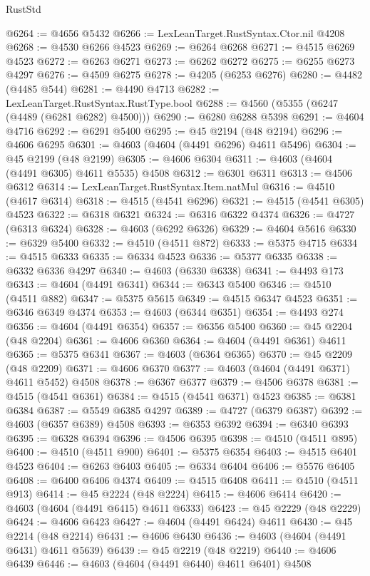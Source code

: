 \begin{lexlean}{RustStd}
\begin{coremodule}
@6264 := @4656 @5432
@6266 := LexLeanTarget.RustSyntax.Ctor.nil @4208
@6268 := @4530 @6266 @4523
@6269 := @6264 @6268
@6271 := @4515 @6269 @4523
@6272 := @6263 @6271
@6273 := @6262 @6272
@6275 := @6255 @6273 @4297
@6276 := @4509 @6275
@6278 := @4205 (@6253 @6276)
@6280 := @4482 (@4485 @544)
@6281 := @4490 @4713
@6282 := LexLeanTarget.RustSyntax.RustType.bool
@6288 := @4560 (@5355 (@6247 (@4489 (@6281 @6282) @4500)))
@6290 := @6280 @6288 @5398
@6291 := @4604 @4716
@6292 := @6291 @5400
@6295 := @45 @2194 (@48 @2194)
@6296 := @4606 @6295
@6301 := @4603 (@4604 (@4491 @6296) @4611 @5496)
@6304 := @45 @2199 (@48 @2199)
@6305 := @4606 @6304
@6311 := @4603 (@4604 (@4491 @6305) @4611 @5535) @4508
@6312 := @6301 @6311
@6313 := @4506 @6312
@6314 := LexLeanTarget.RustSyntax.Item.natMul
@6316 := @4510 (@4617 @6314)
@6318 := @4515 (@4541 @6296)
@6321 := @4515 (@4541 @6305) @4523
@6322 := @6318 @6321
@6324 := @6316 @6322 @4374
@6326 := @4727 (@6313 @6324)
@6328 := @4603 (@6292 @6326)
@6329 := @4604 @5616
@6330 := @6329 @5400
@6332 := @4510 (@4511 @872)
@6333 := @5375 @4715
@6334 := @4515 @6333
@6335 := @6334 @4523
@6336 := @5377 @6335
@6338 := @6332 @6336 @4297
@6340 := @4603 (@6330 @6338)
@6341 := @4493 @173
@6343 := @4604 (@4491 @6341)
@6344 := @6343 @5400
@6346 := @4510 (@4511 @882)
@6347 := @5375 @5615
@6349 := @4515 @6347 @4523
@6351 := @6346 @6349 @4374
@6353 := @4603 (@6344 @6351)
@6354 := @4493 @274
@6356 := @4604 (@4491 @6354)
@6357 := @6356 @5400
@6360 := @45 @2204 (@48 @2204)
@6361 := @4606 @6360
@6364 := @4604 (@4491 @6361) @4611
@6365 := @5375 @6341
@6367 := @4603 (@6364 @6365)
@6370 := @45 @2209 (@48 @2209)
@6371 := @4606 @6370
@6377 := @4603 (@4604 (@4491 @6371) @4611 @5452) @4508
@6378 := @6367 @6377
@6379 := @4506 @6378
@6381 := @4515 (@4541 @6361)
@6384 := @4515 (@4541 @6371) @4523
@6385 := @6381 @6384
@6387 := @5549 @6385 @4297
@6389 := @4727 (@6379 @6387)
@6392 := @4603 (@6357 @6389) @4508
@6393 := @6353 @6392
@6394 := @6340 @6393
@6395 := @6328 @6394
@6396 := @4506 @6395
@6398 := @4510 (@4511 @895)
@6400 := @4510 (@4511 @900)
@6401 := @5375 @6354
@6403 := @4515 @6401 @4523
@6404 := @6263 @6403
@6405 := @6334 @6404
@6406 := @5576 @6405
@6408 := @6400 @6406 @4374
@6409 := @4515 @6408
@6411 := @4510 (@4511 @913)
@6414 := @45 @2224 (@48 @2224)
@6415 := @4606 @6414
@6420 := @4603 (@4604 (@4491 @6415) @4611 @6333)
@6423 := @45 @2229 (@48 @2229)
@6424 := @4606 @6423
@6427 := @4604 (@4491 @6424) @4611
@6430 := @45 @2214 (@48 @2214)
@6431 := @4606 @6430
@6436 := @4603 (@4604 (@4491 @6431) @4611 @5639)
@6439 := @45 @2219 (@48 @2219)
@6440 := @4606 @6439
@6446 := @4603 (@4604 (@4491 @6440) @4611 @6401) @4508

\end{coremodule}
\end{lexlean}
